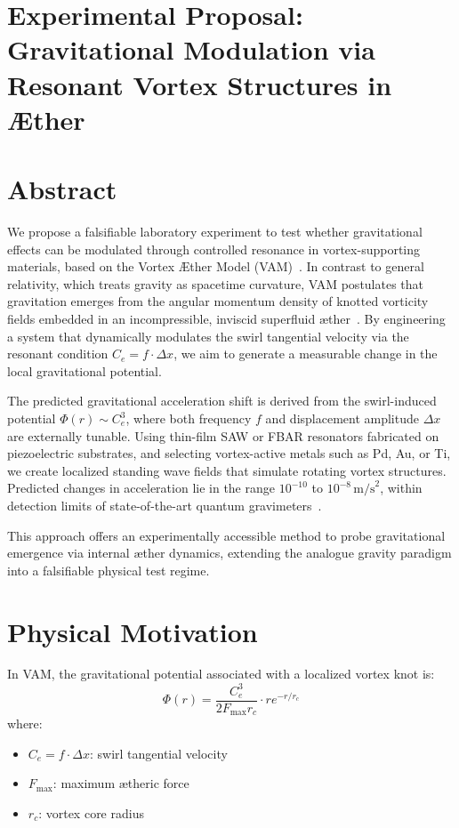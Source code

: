     \section{\textbf{Experimental Proposal: Gravitational Modulation via Resonant Vortex Structures in Æther}}
    \section*{Abstract}
        We propose a falsifiable laboratory experiment to test whether gravitational effects can be modulated through controlled resonance in vortex-supporting materials, based on the Vortex \AE{}ther Model (VAM)~\cite{iskandarani2025vam2, iskandarani2025benchmark}. In contrast to general relativity, which treats gravity as spacetime curvature, VAM postulates that gravitation emerges from the angular momentum density of knotted vorticity fields embedded in an incompressible, inviscid superfluid \ae ther~\cite{iskandarani2025timedilation}. By engineering a system that dynamically modulates the swirl tangential velocity via the resonant condition \( C_e = f \cdot \Delta x \), we aim to generate a measurable change in the local gravitational potential.

        The predicted gravitational acceleration shift is derived from the swirl-induced potential \(\Phi(r) \sim C_e^3\), where both frequency \(f\) and displacement amplitude \(\Delta x\) are externally tunable. Using thin-film SAW or FBAR resonators fabricated on piezoelectric substrates, and selecting vortex-active metals such as Pd, Au, or Ti, we create localized standing wave fields that simulate rotating vortex structures. Predicted changes in acceleration lie in the range \(10^{-10}\) to \(10^{-8} \, \text{m/s}^2\), within detection limits of state-of-the-art quantum gravimeters~\cite{iskandarani2025experimentalCe}.

        This approach offers an experimentally accessible method to probe gravitational emergence via internal æther dynamics, extending the analogue gravity paradigm into a falsifiable physical test regime.


    \section*{Physical Motivation}
    In VAM, the gravitational potential associated with a localized vortex knot is:
    \begin{equation}
        \Phi(r) = \frac{C_e^3}{2 F_{\text{max}} r_c} \cdot r e^{-r / r_c}
    \end{equation}
    where:
    \begin{itemize}
        \item \( C_e = f \cdot \Delta x \): swirl tangential velocity
        \item \( F_{\text{max}} \): maximum ætheric force
        \item \( r_c \): vortex core radius
    \end{itemize}

